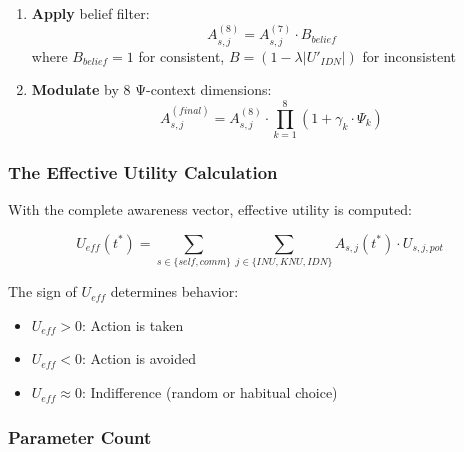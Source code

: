 \begin{enumerate}
    \item \textbf{Apply} belief filter:
    \begin{equation}
    A^{(8)}_{s,j} = A^{(7)}_{s,j} \cdot B_{belief}
    \end{equation}
    where $B_{belief} = 1$ for consistent, $B = (1 - \lambda |U'_{IDN}|)$ for inconsistent
    
    \item \textbf{Modulate} by 8 Ψ-context dimensions:
    \begin{equation}
    A^{(final)}_{s,j} = A^{(8)}_{s,j} \cdot \prod_{k=1}^{8} (1 + \gamma_k \cdot \Psi_k)
    \end{equation}
\end{enumerate}

\subsubsection{The Effective Utility Calculation}

With the complete awareness vector, effective utility is computed:

\begin{equation}
U_{eff}(t^*) = \sum_{s \in \{self,comm\}} \sum_{j \in \{INU,KNU,IDN\}} A_{s,j}(t^*) \cdot U_{s,j,pot}
\label{eq:effective-utility-complete}
\end{equation}

The sign of $U_{eff}$ determines behavior:
\begin{itemize}
    \item $U_{eff} > 0$: Action is taken
    \item $U_{eff} < 0$: Action is avoided
    \item $U_{eff} \approx 0$: Indifference (random or habitual choice)
\end{itemize}

\subsubsection{Parameter Count}

